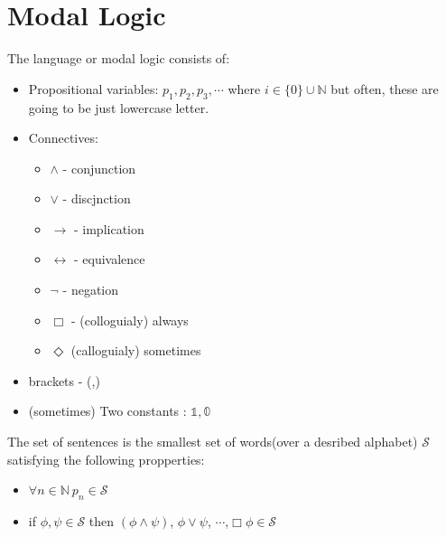 
\chapter{Modal Logic}
{The language or modal logic consists of:
        \begin{itemize}
                \item Propositional variables: $p_1,p_2,p_3,\cdots$ where $i \in \{0\}\cup \mathbb{N}$ but often, these are going to be just lowercase letter.
                \item Connectives:
                        \begin{itemize}
                                \item $\wedge$ - conjunction
                                \item  $\vee$ - discjnction 
                                \item $\rightarrow$ - implication
                                \item $\leftrightarrow$ - equivalence
                                \item  $\neg$ - negation
                                \item $\Box$ - (colloguialy) always
                                \item  $\Diamond$ (calloguialy) sometimes
                        \end{itemize}
                 \item brackets - (,)
                 \item (sometimes) Two constants : $\mathbb{1},\mathbb{0}$


        \end{itemize}        
}

{
 The set of sentences is the smallest set of words(over a desribed alphabet) $\mathcal{S}$ satisfying the following propperties:
        \begin{itemize}
                \item $\forall n \in \mathbb{N} \: p_n \in \mathcal{S}$ 
                \item if $\phi, \psi \in \mathcal{S}$ then $(\phi \wedge \psi)$, $\phi \vee \psi$, $\cdots$,$\Box \phi \in \mathcal{S}$ 
        \end{itemize}
}

